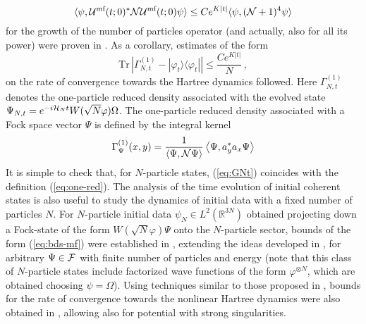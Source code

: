 \documentclass[11pt,a4paper]{article}
\newcommand{\cU}{{\cal U}}
\newcommand{\bR}{{\mathbb R}}
\newcommand{\tr}{\mbox{Tr}}
\newcommand{\cF}{{\cal F}}
\newcommand{\cH}{{\cal H}}
\newcommand{\cN}{{\cal N}}
\begin{document}
\[ \langle \psi , \cU^{\text{mf}} (t;0)^* \cN \cU^{\text{mf}} (t;0) \psi \rangle \leq C e^{K |t|} \langle \psi, (\cN+1)^{4} \psi \rangle \]
for the growth of the number of particles operator (and actually, also for all its power) were proven in \cite{RS}. As a corollary, estimates of the form
\begin{equation}\label{eq:bds-mf} \tr \, \left| \Gamma_{N,t}^{(1)} - |\varphi_t \rangle \langle \varphi_t| \right| \leq \frac{C e^{K|t|}}{N} \, , \end{equation}
on the rate of convergence towards the Hartree dynamics followed. Here $\Gamma_{N,t}^{(1)}$ denotes the one-particle reduced density associated with the evolved state $\Psi_{N,t} = e^{-i\cH_N t} W(\sqrt{N} \varphi) \Omega$. The one-particle reduced density associated with a Fock space vector $\Psi$ is defined by the integral kernel
\begin{equation}\label{eq:GNt} \Gamma_{\Psi}^{(1)} (x,y) = \frac{1}{\langle \Psi , \cN \Psi \rangle} \left\langle \Psi , a_y^* a_x \Psi \right\rangle \end{equation}
It is simple to check that, for $N$-particle states, (\ref{eq:GNt}) coincides with the definition (\ref{eq:one-red}). 
The analysis of the time evolution of initial coherent states is also useful to study the dynamics of initial data with a fixed number of particles $N$. For $N$-particle initial data $\psi_N \in L^2 (\bR^{3N})$ obtained projecting down a Fock-state of the form $W(\sqrt{N} \varphi) \Psi$ onto the $N$-particle sector, bounds of the form (\ref{eq:bds-mf}) were established in \cite{CLS}, extending the ideas developed in \cite{RS}, for arbitrary $\Psi \in \cF$ with finite number of particles and energy (note that this class of $N$-particle states include factorized wave functions of the form $\varphi^{\otimes N}$, which are obtained choosing $\psi = \Omega$). Using techniques similar to those proposed in \cite{P}, bounds for the rate of convergence towards the nonlinear Hartree dynamics were also obtained in \cite{KP2009}, allowing also for potential with strong singularities. 

\bigskip
\end{document}
